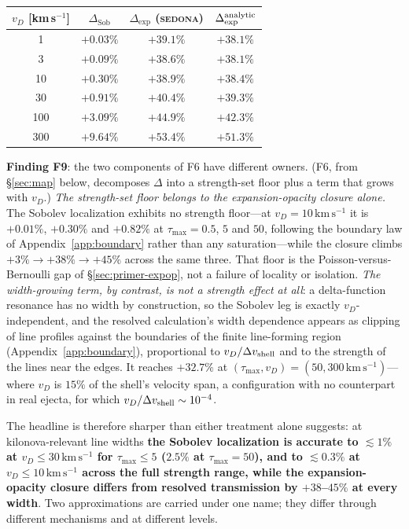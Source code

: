\documentclass[fleqn,usenatbib]{mnras}
\newcommand{\dexp}{\Delta_{\mathrm{exp}}}
\newcommand{\dsobp}{\Delta_{\mathrm{Sob}}}
\newcommand{\kms}{\,\mathrm{km\,s^{-1}}}
\begin{document}
\begin{table}
\centering
\small
\begin{tabular}{@{}cccc@{}}
\toprule
$v_D$ [km\,s$^{-1}$] & $\dsobp$ & $\dexp$ (\textsc{sedona}) & $\dexp^{\rm analytic}$ \\
\midrule
1   & $+0.03\%$ & $+39.1\%$ & $+38.1\%$ \\
3   & $+0.09\%$ & $+38.6\%$ & $+38.1\%$ \\
10  & $+0.30\%$ & $+38.9\%$ & $+38.4\%$ \\
30  & $+0.91\%$ & $+40.4\%$ & $+39.3\%$ \\
100 & $+3.09\%$ & $+44.9\%$ & $+42.3\%$ \\
300 & $+9.64\%$ & $+53.4\%$ & $+51.3\%$ \\
\bottomrule
\end{tabular}
\end{table}

\textbf{Finding F9}: the two components of F6 have different owners. (F6, from
\S\ref{sec:map} below, decomposes $\Delta$ into a strength-set floor plus a
term that grows with $v_D$.)
\emph{The strength-set floor belongs to the expansion-opacity closure alone.}
The Sobolev localization exhibits no strength floor---at $v_D = 10\kms$ it is
$+0.01\%$, $+0.30\%$ and $+0.82\%$ at $\tau_{\max}=0.5$, $5$ and $50$,
following the boundary law of Appendix~\ref{app:boundary} rather than any
saturation---while the closure climbs $+3\% \to +38\% \to +45\%$ across the
same three. That floor is the Poisson-versus-Bernoulli gap of
\S\ref{sec:primer-expop}, not a failure of locality or isolation.
\emph{The width-growing term, by contrast, is not a strength effect at all}: a
delta-function resonance has no width by construction, so the Sobolev leg is
exactly $v_D$-independent, and the resolved calculation's width dependence
appears as clipping of line profiles against the boundaries of the finite
line-forming region (Appendix~\ref{app:boundary}), proportional to
$v_D/\Delta v_{\rm shell}$ and to the strength of the lines near the edges.
It reaches $+32.7\%$ at $(\tau_{\max}, v_D) = (50, 300\kms)$---where $v_D$ is
$15\%$ of the shell's velocity span, a configuration with no counterpart in
real ejecta, for which $v_D/\Delta v_{\rm shell} \sim 10^{-4}$.

The headline is therefore sharper than either treatment alone suggests: at
kilonova-relevant line widths \textbf{the Sobolev localization is accurate to
$\lesssim1\%$ at $v_D\le30\kms$ for $\tau_{\max}\le5$ ($2.5\%$ at
$\tau_{\max}=50$), and to $\lesssim0.3\%$ at $v_D\le10\kms$ across the full
strength range, while the expansion-opacity closure differs from resolved
transmission by $+38$--$45\%$ at every width}. Two approximations are carried
under one name; they differ through different mechanisms and at different
levels.
\end{document}
